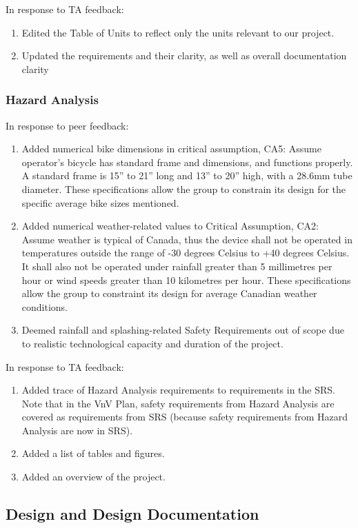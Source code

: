 \documentclass{article}
\begin{document}
\noindent In response to TA feedback:
\begin{enumerate}
    \item Edited the Table of Units to reflect only the units relevant to our project.
    \item Updated the requirements and their clarity, as well as overall documentation clarity
\end{enumerate}

\subsubsection{Hazard Analysis}
In response to peer feedback:
\begin{enumerate}
    \item Added numerical bike dimensions in critical assumption, CA5: Assume operator’s bicycle has standard frame and dimensions, and functions properly. A standard frame is 15” to 21” long and 13” to 20” high, with a 28.6mm tube diameter. These specifications allow the group to constrain its design for the specific average bike sizes mentioned.
    \item Added numerical weather-related values to Critical Assumption, CA2: Assume weather is typical of Canada, thus the device shall not be operated in temperatures outside the range of -30 degrees Celsius to +40 degrees Celsius. It shall also not be operated under rainfall greater than 5 millimetres per hour or wind speeds greater than 10 kilometres per hour. These specifications allow the group to constraint its design for average Canadian weather conditions.
    \item Deemed rainfall and splashing-related Safety Requirements out of scope due to realistic technological capacity and duration of the project.
\end{enumerate}

\noindent In response to TA feedback:
\begin{enumerate}
    \item Added trace of Hazard Analysis requirements to requirements in the SRS. Note that in the VnV Plan, safety requirements from Hazard Analysis are covered as requirements from SRS (because safety requirements from Hazard Analysis are now in SRS).
    \item Added a list of tables and figures.
    \item Added an overview of the project.
\end{enumerate}

\subsection{Design and Design Documentation}
\end{document}
